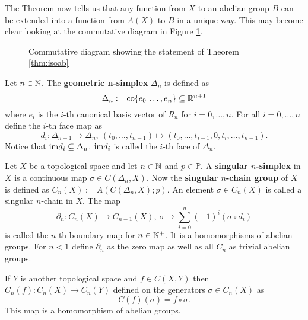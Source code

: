 The Theorem now tells us that any function from $X$ to an abelian group $B$ can be extended into a function from $A(X)$ to $B$ in a unique way. This may become clear looking at the commutative diagram in Figure \ref{fig:com1}.

\begin{figure}[h!]
  \centering
  \caption{Commutative diagram showing the statement of Theorem \ref{thm:isoab}}\label{fig:com1}
\end{figure}

\begin{defin}
  Let $n\in\mathbb{N}$. The \textbf{geometric n-simplex} $\Delta_n$ is defined as
  \begin{equation*}
    \Delta_n := {\rm co}\{e_0\, \ldots, e_n\} \subseteq \mathbb{R}^{n+1}
  \end{equation*}
  where $e_i$ is the $i$-th canonical basis vector of $R_n$ for $i = 0,\ldots,n$. For all $i = 0, \ldots, n$ define the $i$-th face map as
  \begin{equation*}
    d_i\colon \Delta_{n-1} \to \Delta_n,\: (t_0,\ldots,t_{n-1}) \mapsto (t_0, \ldots, t_{i-1}, 0, t_i, \ldots, t_{n-1}).
  \end{equation*}
  Notice that ${\rm im} d_i \subseteq \Delta_n$. ${\rm im} d_i$ is called the $i$-th face of $\Delta_n$.
\end{defin}

\begin{defin}
  Let $X$ be a topological space and let $n\in \mathbb{N}$ and $p \in \mathbb{P}$. A \textbf{singular $n$-simplex} in $X$ is a continuous map $\sigma \in C(\Delta_n, X)$.
  Now the \textbf{singular $n$-chain group} of $X$ is defined as $C_n(X) := A(C(\Delta_n, X); p)$. An element $\sigma \in C_n(X)$ is called a singular $n$-chain in $X$.
  The map \[\partial_n\colon C_n(X) \to C_{n-1}(X),\: \sigma \mapsto \sum\limits_{i=0}^n(-1)^i(\sigma \circ d_i)\] is called the $n$-th boundary map for $n\in\mathbb{N}^+$. It is a homomorphisms of abelian groups. For $n < 1$ define $\partial_n$ as the zero map as well as all $C_n$ as trivial abelian groups.

  If $Y$ is another topological space and $f \in C(X, Y)$ then $C_n(f)\colon C_n(X) \to C_n(Y)$ defined on the generators $\sigma \in C_n(X)$ as
  \begin{equation*}
    C(f)(\sigma) = f \circ \sigma.
  \end{equation*}
  This map is a homomorphism of abelian groups.
\end{defin}

